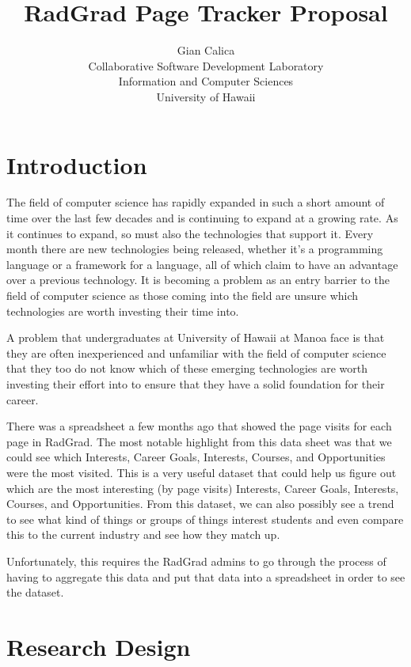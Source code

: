 \documentclass[english]{proposalnsf}
\title{RadGrad Page Tracker Proposal}
\author{Gian Calica \\Collaborative Software Development Laboratory \\ Information and Computer Sciences \\ University of Hawaii}
\begin{document}
    \maketitle
    \tableofcontents
    \newpage

    \section{Introduction}
    \label{sec:introduction}
    The field of computer science has rapidly expanded in such a short amount of time over the last few decades and is
    continuing to expand at a growing rate.
    As it continues to expand, so must also the technologies that support it.
    Every month there are new technologies being released, whether it's a programming language or a framework for a
    language, all of which claim to have an advantage over a previous technology.
    It is becoming a problem as an entry barrier to the field of computer science as those coming into the field are
    unsure which technologies are worth investing their time into.


    A problem that undergraduates at University of Hawaii at Manoa face is that they are often inexperienced and unfamiliar with the field of computer science that they too do not know which of these emerging technologies are worth investing their effort into to ensure that they have a solid foundation for their career.

    There was a spreadsheet a few months ago that showed the page visits for each page in RadGrad.
    The most notable highlight from this data sheet was that we could see which Interests, Career Goals, Interests, Courses, and Opportunities were the most visited.
    This is a very useful dataset that could help us figure out which are the most interesting (by page visits) Interests, Career Goals, Interests, Courses, and Opportunities.
    From this dataset, we can also possibly see a trend to see what kind of things or groups of things interest students and even compare this to the current industry and see how they match up.

    Unfortunately, this requires the RadGrad admins to go through the process of having to aggregate this data and put that data into a spreadsheet in order to see the dataset.

    \section{Research Design}
    \label{sec:research-design}
\end{document}
